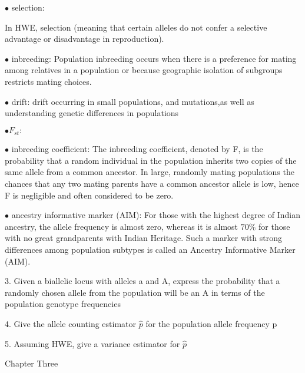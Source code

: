 \documentclass{article}
\begin{document}
\vspace{1pc}
$\bullet$ selection:

In HWE, selection (meaning that certain alleles do not confer a selective advantage or disadvantage in reproduction).

\vspace{1pc}
$\bullet$ inbreeding:
Population inbreeding occurs when there is a preference for mating among relatives in a population or because geographic isolation of subgroups restricts mating choices.


\vspace{1pc}
$\bullet$ drift:
drift occurring in small populations, and mutations,as well as understanding genetic differences in populations

\vspace{1pc}
$\bullet  F_{st}:$ 


\vspace{1pc}
$\bullet$ inbreeding coefficient:
The inbreeding coefficient, denoted by F, is the
probability that a random individual in the population inherits two copies of the
same allele from a common ancestor. In large, randomly mating populations the
chances that any two mating parents have a common ancestor allele is low, hence F
is negligible and often considered to be zero.

\vspace{1pc}
$\bullet$ ancestry informative marker (AIM):
For those with the highest degree of Indian ancestry, the allele frequency
is almost zero, whereas it is almost $70\% $ for those with no great grandparents with
Indian Heritage. Such a marker with strong differences among population subtypes
is called an Ancestry Informative Marker (AIM).



\vspace{2pc}
3. Given a biallelic locus with alleles a and A, express the probability that a
randomly chosen allele from the population will be an A in terms of the
population genotype frequencies


\vspace{2pc}
4. Give the allele counting estimator $\hat{p}$ for the population allele frequency p


\vspace{2pc}
5. Assuming HWE, give a variance estimator for $\hat{p} $



\newpage
\centerline{\sc Chapter Three}
\end{document}

